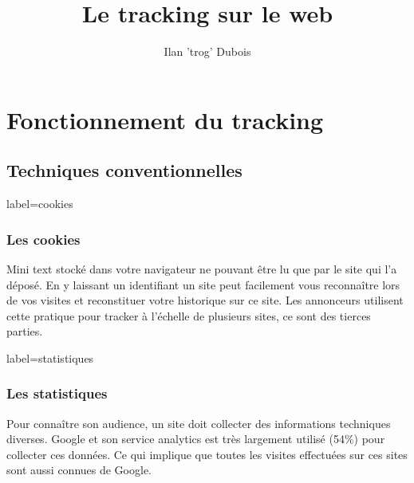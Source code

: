 \documentclass{beamer}
\title{Le tracking sur le web}
\author{Ilan 'trog' Dubois}
\begin{document}
    \begin{frame}
        \titlepage
    \end{frame}
    \section{Fonctionnement du tracking}
    \subsection{Techniques conventionnelles}
    \begin{frame}{label=cookies}
        \frametitle{Les cookies}
        \begin{center}
            Mini text stocké dans votre navigateur ne pouvant être lu que par le site qui l'a déposé.
            En y laissant un identifiant un site peut facilement vous reconnaître lors de vos visites et reconstituer votre historique sur ce site.
            Les annonceurs utilisent cette pratique pour tracker à l'échelle de plusieurs sites, ce sont des tierces parties.
        \end{center}
    \end{frame}
    \begin{frame}{label=statistiques}
        \frametitle{Les statistiques}
        \begin{center}
            Pour connaître son audience, un site doit collecter des informations techniques diverses.
            Google et son service analytics est très largement utilisé (54\%) pour collecter ces données.
            Ce qui implique que toutes les visites effectuées sur ces sites sont aussi connues de Google.
        \end{center}
    \end{frame}
\end{document}
